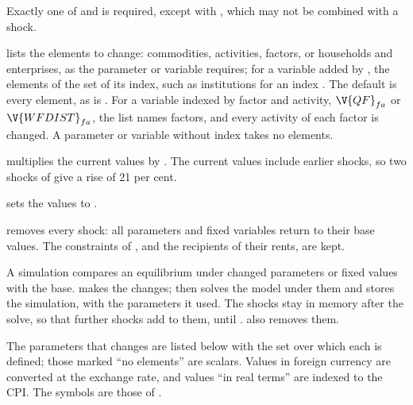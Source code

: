Exactly one of  and  is required, except with
, which may not be combined with a shock.


\begin{optdesc}
\item[\optarg{el}{ements}{list}] lists the elements to change: commodities,
activities, factors, or households and enterprises, as the parameter or
variable requires; for a variable added by , the
elements of the set of its index, such as institutions for an index .
The default is every element, as is . For
a variable indexed by factor and activity, $\V{QF}_{fa}$ or
$\V{WFDIST}_{fa}$, the list names factors, and every activity of each factor is
changed. A parameter or variable without index takes no elements.

\item[\optarg{sc}{ale}{\#}] multiplies the current values by \argu{\#}. The
current values include earlier shocks, so two shocks of  give
a rise of 21 per cent.

\item[\optarg{val}{ue}{\#}] sets the values to \argu{\#}.

\item[\opt{}{reset}] removes every shock: all parameters and fixed variables
return to their base values. The constraints of , and
the recipients of their rents, are kept.
\end{optdesc}


A simulation compares an equilibrium under changed parameters or fixed values
with the base.  makes the changes;  then
solves the model under them and stores the simulation, with the parameters it
used. The shocks stay in memory after the solve, so that further shocks add to
them, until .  also removes them.


The parameters that  changes are listed below with the set over
which each is defined; those marked ``no elements'' are scalars. Values in
foreign currency are converted at the exchange rate, and values ``in real
terms'' are indexed to the CPI. The symbols are those of
.

